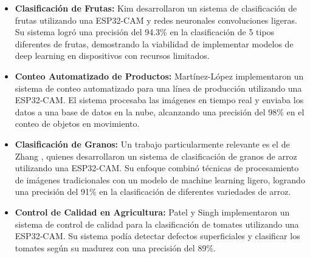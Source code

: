 \begin{itemize}
    \item \textbf{Clasificación de Frutas:} Kim \cite{kim2022embedded} desarrollaron un sistema de clasificación de frutas utilizando una ESP32-CAM y redes neuronales convoluciones ligeras. Su sistema logró una precisión del 94.3\% en la clasificación de 5 tipos diferentes de frutas, demostrando la viabilidad de implementar modelos de deep learning en dispositivos con recursos limitados.
    \item \textbf{Conteo Automatizado de Productos:} Martínez-López \cite{martinez2023automated} implementaron un sistema de conteo automatizado para una línea de producción utilizando una ESP32-CAM. El sistema procesaba las imágenes en tiempo real y enviaba los datos a una base de datos en la nube, alcanzando una precisión del 98\% en el conteo de objetos en movimiento.

    \item \textbf{Clasificación de Granos:} Un trabajo particularmente relevante es el de Zhang \cite{zhang2021rice}, quienes desarrollaron un sistema de clasificación de granos de arroz utilizando una ESP32-CAM. Su enfoque combinó técnicas de procesamiento de imágenes tradicionales con un modelo de machine learning ligero, logrando una precisión del 91\% en la clasificación de diferentes variedades de arroz.
     
    \item \textbf{Control de Calidad en Agricultura:} Patel y Singh \cite{patel2023quality} implementaron un sistema de control de calidad para la clasificación de tomates utilizando una ESP32-CAM. Su sistema podía detectar defectos superficiales y clasificar los tomates según su madurez con una precisión del 89\%.
\end{itemize}